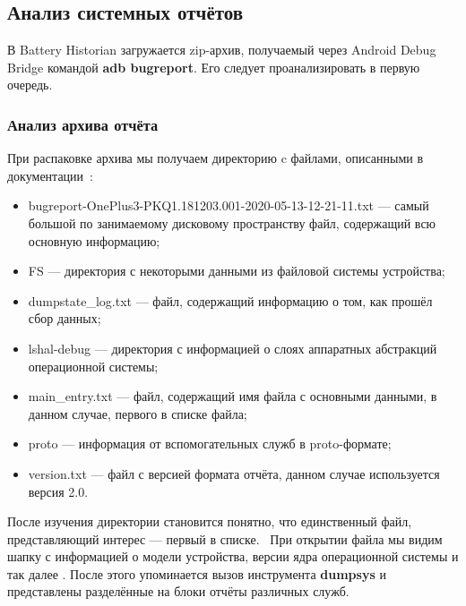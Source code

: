 \documentclass[a4paper,14pt]{extarticle} %
\begin{document}
	\subsection{Анализ системных отчётов}
	
	В Battery Historian загружается zip-архив, получаемый через Android Debug Bridge командой \textbf{adb bugreport}. Его следует проанализировать в первую очередь.
	
	\subsubsection{Анализ архива отчёта}
	
	При распаковке архива мы получаем директорию c файлами, описанными в документации~\parencite{BugreportFormat}:
	\begin{itemize}
		\item bugreport-OnePlus3-PKQ1.181203.001-2020-05-13-12-21-11.txt --- самый большой по занимаемому дисковому пространству файл, содержащий всю основную информацию;
		\item FS --- директория с некоторыми данными из файловой системы устройства;
		\item dumpstate\_log.txt --- файл, содержащий информацию о том, как прошёл сбор данных;
		\item lshal-debug --- директория с информацией о слоях аппаратных абстракций операционной системы;
		\item main\_entry.txt --- файл, содержащий имя файла с основными данными, в данном случае, первого в списке файла;
		\item proto --- информация от вспомогательных служб в proto-формате;
		\item version.txt --- файл с версией формата отчёта, данном случае используется версия 2.0.
	\end{itemize}

	После изучения директории становится понятно, что единственный файл, представляющий интерес --- первый в списке.  При открытии файла мы видим шапку с информацией о модели устройства, версии ядра операционной системы и так далее \ris{\ref{fig:report_header}}. После этого упоминается вызов инструмента \textbf{dumpsys} и представлены разделённые на блоки отчёты различных служб.
	
\end{document}
